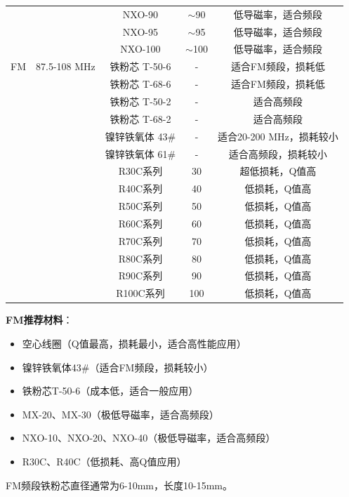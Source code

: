 \begin{center}
\begin{tabular}{|c|c|c|c|c|}
 & & NXO-90 & $\sim$90 & 低导磁率，适合频段 \\
 & & NXO-95 & $\sim$95 & 低导磁率，适合频段 \\
 & & NXO-100 & $\sim$100 & 低导磁率，适合频段 \\
\hline
FM & 87.5-108 MHz & 铁粉芯 T-50-6 & - & 适合FM频段，损耗低 \\
 & & 铁粉芯 T-68-6 & - & 适合FM频段，损耗低 \\
 & & 铁粉芯 T-50-2 & - & 适合高频段 \\
 & & 铁粉芯 T-68-2 & - & 适合高频段 \\
 & & 镍锌铁氧体 43\# & - & 适合20-200 MHz，损耗较小 \\
 & & 镍锌铁氧体 61\# & - & 适合高频段，损耗较小 \\
 & & R30C系列 & 30 & 超低损耗，Q值高 \\
 & & R40C系列 & 40 & 低损耗，Q值高 \\
 & & R50C系列 & 50 & 低损耗，Q值高 \\
 & & R60C系列 & 60 & 低损耗，Q值高 \\
 & & R70C系列 & 70 & 低损耗，Q值高 \\
 & & R80C系列 & 80 & 低损耗，Q值高 \\
 & & R90C系列 & 90 & 低损耗，Q值高 \\
 & & R100C系列 & 100 & 低损耗，Q值高 \\
\hline
\end{tabular}
\end{center}

\textbf{FM推荐材料}：
\begin{itemize}
    \item 空心线圈（Q值最高，损耗最小，适合高性能应用）
    \item 镍锌铁氧体43\#（适合FM频段，损耗较小）
    \item 铁粉芯T-50-6（成本低，适合一般应用）
    \item MX-20、MX-30（极低导磁率，适合高频段）
    \item NXO-10、NXO-20、NXO-40（极低导磁率，适合高频段）
    \item R30C、R40C（低损耗、高Q值应用）
\end{itemize}

FM频段铁粉芯直径通常为6-10mm，长度10-15mm。